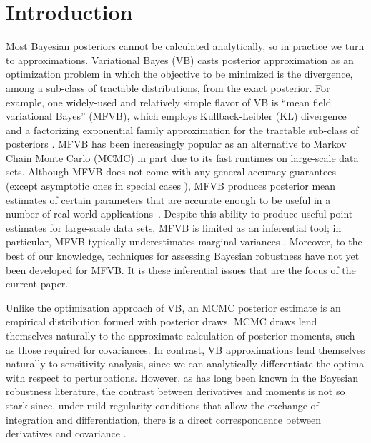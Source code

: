 \documentclass{article}\usepackage[]{graphicx}\usepackage[]{color}
\theoremstyle{definition}
\theoremstyle{plain}
\theoremstyle{plain}
\theoremstyle{plain}
\theoremstyle{definition}
\theoremstyle{plain}
\theoremstyle{plain}
\begin{document}
\section{Introduction
\label{sec:intro}}
Most Bayesian posteriors cannot be calculated analytically, so in practice we
turn to approximations. Variational Bayes (VB) casts posterior approximation as
an optimization problem in which the objective to be minimized is the
divergence, among a sub-class of tractable distributions, from the
exact posterior. For example, one widely-used and relatively simple flavor of VB
is ``mean field variational Bayes'' (MFVB), which employs Kullback-Leibler (KL)
divergence and a factorizing exponential family approximation for the tractable
sub-class of posteriors \citep{wainwright2008graphical}. MFVB has been
increasingly popular as an alternative to Markov Chain Monte Carlo (MCMC) in
part due to its fast runtimes on large-scale data sets. Although MFVB does not
come with any general accuracy guarantees (except asymptotic ones in special
cases \citep{westling:2015:vbconsistency,wang:2017:vbconsistency}), MFVB
produces posterior mean estimates of certain parameters that are accurate enough
to be useful in a number of real-world applications~\citep{blei:2016:variational}.
Despite this ability to produce useful point estimates for large-scale data sets,
MFVB is limited as an inferential tool; in particular, MFVB
typically underestimates marginal variances
\citep{mackay:2003:information,wang:2005:inadequacy,turner:2011:two}.  Moreover, to
the best of our knowledge, techniques for assessing Bayesian robustness have not yet been
developed for MFVB.  It is these inferential issues that are the focus of the
current paper.

Unlike the optimization approach of VB,
an MCMC posterior estimate is an empirical distribution formed with
posterior draws.
MCMC draws lend themselves
naturally to the approximate calculation of posterior moments, such
as those required for covariances. In contrast, VB approximations
lend themselves naturally to sensitivity analysis, since we can analytically
differentiate the optima with respect to perturbations.
However, as has long been known in the Bayesian robustness literature, the
contrast between derivatives and moments is not so stark since, under mild
regularity conditions that allow the exchange of integration and
differentiation, there is a direct correspondence between derivatives and
covariance
\citep[][ below]{gustafson:1996:localposterior,basu:1996:local,efron:2015:frequentist}.
\end{document}
